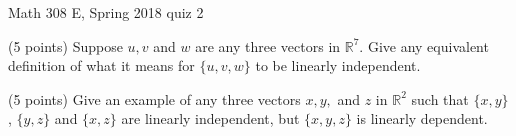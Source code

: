 \documentclass{exam}
\begin{document}
 
\begin{center} \begin{Large} Math 308 E, Spring 2018 quiz 2 \end{Large}
\end{center} 

\vspace{5mm}

\begin{center}
\end{center}

\vspace{1cm}
 

\vspace{1cm}

\begin{questions}
\question (5 points) Suppose $u,v$ and $w$ are any three vectors in $\mathbb{R}^7$. Give any equivalent definition of what it means for $\{u,v,w\}$ to be linearly independent. 

\vfill

\question (5 points) Give an example of any three vectors $x,y,$ and $z$ in $\mathbb{R}^2$ such that $\{x,y\}$, $\{y,z\}$ and $\{x,z\}$ are linearly independent, but $\{x,y,z\}$ is linearly dependent.

\vfill

\end{questions}
\end{document}
